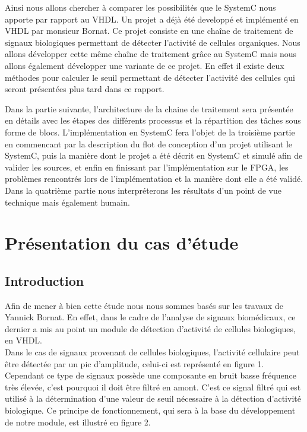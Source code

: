\documentclass[a4paper,12pt]{article}
\begin{document}
Ainsi nous allons chercher à comparer les possibilités que le SystemC nous apporte par rapport au VHDL. Un projet a déjà été developpé et implémenté en VHDL par monsieur Bornat. Ce projet consiste en une chaîne de traitement de signaux biologiques permettant de détecter l'activité de cellules organiques. Nous allons développer cette même chaîne de traitement grâce au SystemC mais nous allons également développer une variante de ce projet. En effet il existe deux méthodes pour calculer le seuil permettant de détecter l'activité des cellules qui seront présentées plus tard dans ce rapport.\newline

Dans la partie suivante, l'architecture de la chaine de traitement sera présentée en détails avec les étapes des différents processus et la répartition des tâches sous forme de blocs. L'implémentation en SystemC fera l'objet de la troisième partie en commencant par la description du flot de conception d'un projet utilisant le SystemC, puis la manière dont le projet a été décrit en SystemC et simulé afin de valider les sources, et enfin en finissant par l'implémentation sur le FPGA, les problèmes rencontrés lors de l'implémentation et la manière dont elle a été validé. Dans la quatrième partie nous interpréterons les résultats d'un point de vue technique mais également humain.

\newpage
\section{Présentation du cas d'étude}
\subsection{Introduction}
Afin de mener à bien cette étude nous nous sommes basés sur les travaux de Yannick Bornat. En effet, dans le cadre de l'analyse de signaux biomédicaux, ce dernier a mis au point un module de détection d'activité de cellules biologiques, en VHDL.\\

Dans le cas de signaux provenant de cellules biologiques, l'activité cellulaire peut être détectée par un pic d'amplitude, celui-ci est représenté en figure 1. Cependant ce type de signaux possède une composante en bruit basse fréquence très élevée, c'est pourquoi il doit être filtré en amont. C'est ce signal filtré qui est utilisé à la détermination d'une valeur de seuil nécessaire à la détection d'activité biologique. Ce principe de fonctionnement, qui sera à la base du développement de notre module, est illustré en figure 2.\\
\end{document}
